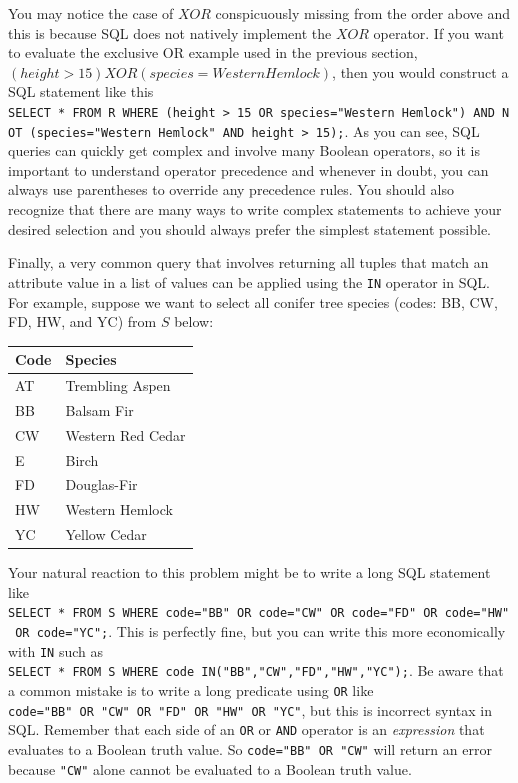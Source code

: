 \documentclass[
]{book}
\begin{document}
You may notice the case of \(XOR\) conspicuously missing from the order above and this is because SQL does not natively implement the \(XOR\) operator. If you want to evaluate the exclusive OR example used in the previous section, \((height>15)XOR(species=WesternHemlock)\), then you would construct a SQL statement like this \texttt{SELECT\ *\ FROM\ R\ WHERE\ (height\ \textgreater{}\ 15\ OR\ species="Western\ Hemlock")\ AND\ NOT\ (species="Western\ Hemlock"\ AND\ height\ \textgreater{}\ 15);}. As you can see, SQL queries can quickly get complex and involve many Boolean operators, so it is important to understand operator precedence and whenever in doubt, you can always use parentheses to override any precedence rules. You should also recognize that there are many ways to write complex statements to achieve your desired selection and you should always prefer the simplest statement possible.

Finally, a very common query that involves returning all tuples that match an attribute value in a list of values can be applied using the \texttt{IN} operator in SQL. For example, suppose we want to select all conifer tree species (codes: BB, CW, FD, HW, and YC) from \(S\) below:

\begin{tabular}{ll}
\toprule
Code & Species\\
\midrule
AT & Trembling Aspen\\
BB & Balsam Fir\\
CW & Western Red Cedar\\
E & Birch\\
FD & Douglas-Fir\\
\addlinespace
HW & Western Hemlock\\
YC & Yellow Cedar\\
\bottomrule
\end{tabular}

Your natural reaction to this problem might be to write a long SQL statement like \texttt{SELECT\ *\ FROM\ S\ WHERE\ code="BB"\ OR\ code="CW"\ OR\ code="FD"\ OR\ code="HW"\ OR\ code="YC";}. This is perfectly fine, but you can write this more economically with \texttt{IN} such as \texttt{SELECT\ *\ FROM\ S\ WHERE\ code\ IN("BB","CW","FD","HW","YC");}. Be aware that a common mistake is to write a long predicate using \texttt{OR} like \texttt{code="BB"\ OR\ "CW"\ OR\ "FD"\ OR\ "HW"\ OR\ "YC"}, but this is incorrect syntax in SQL. Remember that each side of an \texttt{OR} or \texttt{AND} operator is an \emph{expression} that evaluates to a Boolean truth value. So \texttt{code="BB"\ OR\ "CW"} will return an error because \texttt{"CW"} alone cannot be evaluated to a Boolean truth value.
\end{document}
